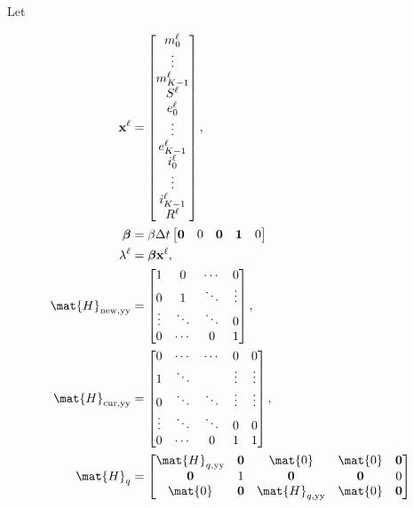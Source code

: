 \documentclass{jpmarticle}
\renewcommand{\vec}[1]{\boldsymbol{\mathrm{#1}}}
\let\subequationsorig\subequations%
\let\endsubequationsorig\endsubequations%
\renewenvironment{subequations}{
  \subequationsorig
  \renewcommand{\theequation}{\theparentequation.\arabic{equation}}
}{
  \endsubequationsorig
}
\begin{document}
Let
\begin{subequations}
  \begin{align}
    \vec{x}^{\ell} &=
    \begin{bmatrix}
      m_0^{\ell} \\ \vdots \\ m_{K - 1}^{\ell} \\
      S^{\ell} \\
      e_0^{\ell} \\ \vdots \\ e_{K - 1}^{\ell} \\
      i_0^{\ell} \\ \vdots \\ i_{K - 1}^{\ell} \\
      R^{\ell}
    \end{bmatrix},
    \\
    \vec{\beta} &=
    \beta \Delta t
    \begin{bmatrix}
      \vec{0} & 0 & \vec{0} & \vec{1} & 0
    \end{bmatrix}
    \\
    \lambda^{\ell} &=
    \vec{\beta} \vec{x}^{\ell},
    \\
    \mat{H}_{\mathrm{new}, \mathrm{yy}} &=
    \begin{bmatrix}
      1 & 0 & \cdots & 0 \\
      0 & 1 & \ddots & \vdots \\
      \vdots & \ddots & \ddots & 0 \\
      0 & \cdots & 0 & 1
    \end{bmatrix},
    \\
    \mat{H}_{\mathrm{cur}, \mathrm{yy}} &=
    \begin{bmatrix}
      0 & \cdots & \cdots & 0 & 0 \\
      1 & \ddots & & \vdots & \vdots \\
      0 & \ddots & \ddots & \vdots & \vdots \\
      \vdots & \ddots & \ddots & 0 & 0 \\
      0 & \cdots & 0 & 1 & 1
    \end{bmatrix},
    \\
    \mat{H}_{q} &=
    \begin{bmatrix}
      \mat{H}_{q, \mathrm{yy}} & \vec{0} & \mat{0} & \mat{0} & \vec{0} \\
      \vec{0} & 1 & \vec{0} & \vec{0} & 0 \\
      \mat{0} & \vec{0} & \mat{H}_{q, \mathrm{yy}} & \mat{0} & \vec{0} \\

\end{bmatrix}
\end{align}
\end{subequations}
\end{document}
